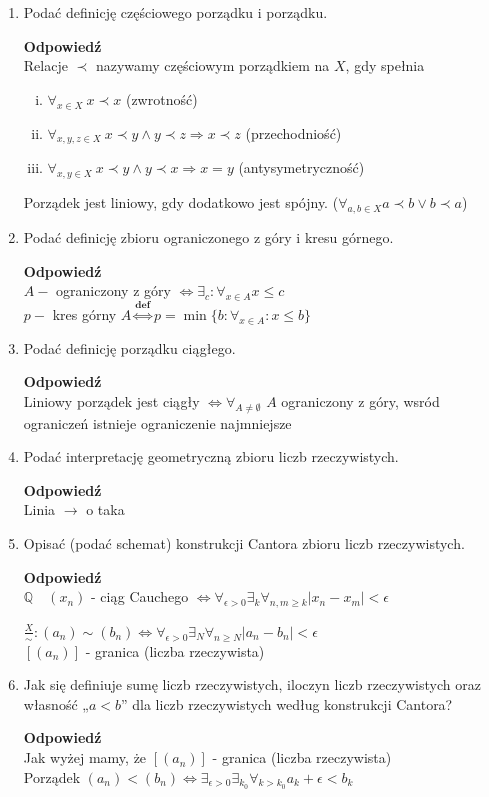 \documentclass[12pt,a4paper]{article}
\theoremstyle{break}
\newcommand{\Odp}[1]{
		\begin{mdframed}[style=zadanie]
			\textbf{Odpowiedź}\\
			#1
		\end{mdframed}
	}
\begin{document}
\begin{enumerate}[1.]
	\item Podać definicję częściowego porządku i porządku.
	\Odp{
		Relacje $\prec$ nazywamy częściowym porządkiem na $X$, gdy spełnia
		\begin{enumerate}[i)]
			\item $\forall_{x \in X} \:x \prec x$ (zwrotność)
			\item $\forall_{x,y,z \in X} \: x\prec y \wedge y\prec z \Rightarrow x\prec z$ (przechodniość)
			\item $\forall_{x,y\in X} \: x\prec y \wedge y \prec x \Rightarrow x = y$ (antysymetryczność)
		\end{enumerate}
		
		Porządek jest liniowy, gdy dodatkowo jest spójny. ($\forall_{a,b \in X} a\prec b \vee b \prec a$)
	}
	
	\item Podać definicję zbioru ograniczonego z góry i kresu górnego.
	\Odp{
	$A-$ ograniczony z góry $\Leftrightarrow \exists_c : \forall_{x\in A} x\leq c$\\
	$p-$ kres górny $A \overset{\textbf{def}}{\Leftrightarrow} p=\min\{b:\forall_{x\in A} : x\leq b\}$
	}
	
	\item Podać definicję porządku ciągłego.
	\Odp{
	Liniowy porządek jest ciągły $\Leftrightarrow \forall_{A\neq \emptyset}$ $A$ ograniczony z góry, wsród ograniczeń istnieje ograniczenie najmniejsze
	}
	
	\item Podać interpretację geometryczną zbioru liczb rzeczywistych.
	\Odp{
	Linia $\longrightarrow$ o taka
	}
	
	\item Opisać (podać schemat) konstrukcji Cantora zbioru liczb rzeczywistych.
	\Odp{
		$\mathbb{Q} \quad (x_n)$ - ciąg Cauchego $\Leftrightarrow \forall_{\epsilon>0} \exists_{k} \forall_{n,m\geq k} |x_n-x_m|<\epsilon$
		
		$\frac{X}{\sim}: (a_n)\sim(b_n) \Leftrightarrow \forall_{\epsilon>0} \exists_N \forall_{n\geq N} |a_n-b_n|<\epsilon$\\
		$[(a_n)]$ - granica (liczba rzeczywista)
	}
	
	\item Jak się definiuje sumę liczb rzeczywistych, iloczyn liczb rzeczywistych oraz własność „$a < b$” dla liczb rzeczywistych według konstrukcji Cantora?
	\Odp{
		Jak wyżej mamy, że $[(a_n)]$ - granica (liczba rzeczywista)\\
		Porządek $(a_n) < (b_n) \Leftrightarrow \exists_{\epsilon>0} \exists_{k_0} \forall_{k>k_0} a_k + \epsilon < b_k$
		
}
\end{enumerate}
\end{document}
